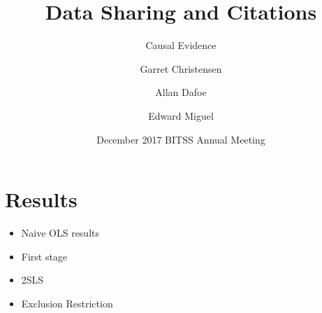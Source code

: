 \documentclass{beamer}
\title[Data Sharing and Citations] %
{Data Sharing and Citations}
\subtitle
{Causal Evidence} %
\author[Christensen, Dafoe, Miguel] %
{Garret Christensen\inst{1} \and Allan Dafoe\inst{2} \and Edward Miguel\inst{3}}
\institute[Universities of Somewhere and Elsewhere] %
{
  \inst{1}%
  Berkeley Institute for Data Science, UC Berkeley
  \and
  \inst{2}%
  Department of Political Science, Yale University
  \and
  \inst{3}%
  Department of Economics, UC Berkeley}
\date[Short Occasion] %
{December 2017 BITSS Annual Meeting}
\begin{document}
%
%
%
%
%
%
%


\section{Results}
\begin{frame}
	\begin{itemize}
		\item Naive OLS results
		\item First stage
		\item 2SLS
		\item Exclusion Restriction
	\end{itemize}
\end{frame}
\end{document}
